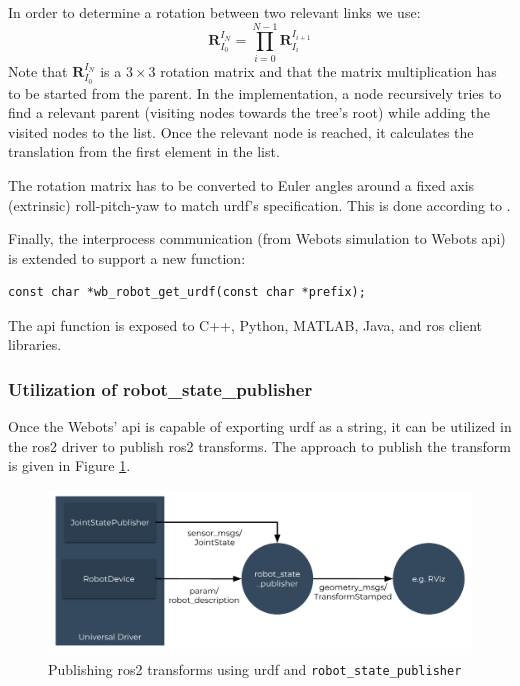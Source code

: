 In order to determine a rotation between two relevant links we use:
\begin{equation}
    \bm{R}_{I_0}^{I_N} = \prod_{i=0}^{N-1} \bm{R}_{I_i}^{I_{i+1}}
\end{equation}
Note that $ \bm{R}_{I_0}^{I_N} $ is a $ 3 \times 3 $ rotation matrix and that the matrix multiplication has to be started from the parent.
In the implementation, a node recursively tries to find a relevant parent (visiting nodes towards the tree's root) while adding the visited nodes to the list.
Once the relevant node is reached, it calculates the translation from the first element in the list.

The rotation matrix has to be converted to Euler angles around a fixed axis (extrinsic) roll-pitch-yaw to match \ac{urdf}'s specification. This is done according to \cite[p. 9]{eberly_euler_nodate}.

Finally, the interprocess communication (from Webots simulation to Webots \ac{api}) is extended to support a new function:

\begin{verbatim}
const char *wb_robot_get_urdf(const char *prefix);
\end{verbatim}

The \ac{api} function is exposed to C++, Python, MATLAB, Java, and \ac{ros} client libraries.

\subsubsection{Utilization of robot\_state\_publisher}

Once the Webots' \ac{api} is capable of exporting \ac{urdf} as a string, it can be utilized in the \ac{ros2} driver to publish \ac{ros2} transforms.
The approach to publish the transform is given in Figure \ref{fig:generalization:transforms_method_3}.

\begin{figure}[H]
    \centering
    \includegraphics[width=\textwidth]{generalization/figures/transforms_method_3.pdf}
    \caption{Publishing \ac{ros2} transforms using \ac{urdf} and \texttt{robot\_state\_publisher}}
    \label{fig:generalization:transforms_method_3}
\end{figure}

